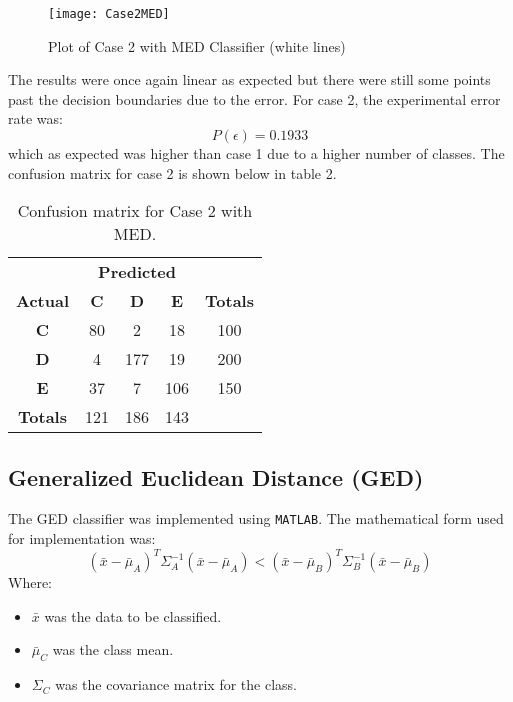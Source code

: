 \documentclass{article}
\begin{document}
\begin{figure}[H]
\caption{Plot of Case 2 with MED Classifier (white lines)}
\centering
\texttt{[image: Case2MED]}
\label{fig:Case2_MED}
\end{figure}

The results were once again linear as expected but there were still some points past the decision boundaries due to the error. For case 2, the experimental error rate was:
\[P(\epsilon) = 0.1933\]
which as expected was higher than case 1 due to a higher number of classes. The confusion matrix for case 2 is shown below in table 2.

\begin{table}[H]
    \centering
    \begin{tabular}{c|c c c|c|}
        & \multicolumn{3}{c|}{\textbf{Predicted}} \\
        \textbf{Actual} & \textbf{C} & \textbf{D} & \textbf{E} & \textbf{Totals} \\
        \hline
        \textbf{C} & 80 \cellcolor[gray]{.8} & 2 & 18 & 100 \\
        \textbf{D} & 4 & 177 \cellcolor[gray]{.8} & 19 & 200\\
        \textbf{E} & 37 & 7 & 106 \cellcolor[gray]{.8} & 150\\\hline
        \textbf{Totals} & 121 & 186 & 143\\
        \cline{1-4}

    \end{tabular}
    \caption{Confusion matrix for Case 2 with MED.}
    \label{tab:Case2_MED_error}
\end{table}

\subsection{Generalized Euclidean Distance (GED)}
The GED classifier was implemented using \verb|MATLAB|. The mathematical form used for implementation was:
\[(\bar{x} - \bar{\mu}_{A})^{T}\Sigma^{-1}_{A}(\bar{x} - \bar{\mu}_{A}) <
    (\bar{x} - \bar{\mu}_{B})^{T}\Sigma^{-1}_{B}(\bar{x} - \bar{\mu}_{B})\]
Where:
\begin{itemize}
    \item {$\bar{x}$ was the data to be classified.}
    \item {$\bar{\mu}_C$ was the class mean.}
    \item {$\Sigma_{C}$ was the covariance matrix for the class.}
\end{itemize}
\end{document}
